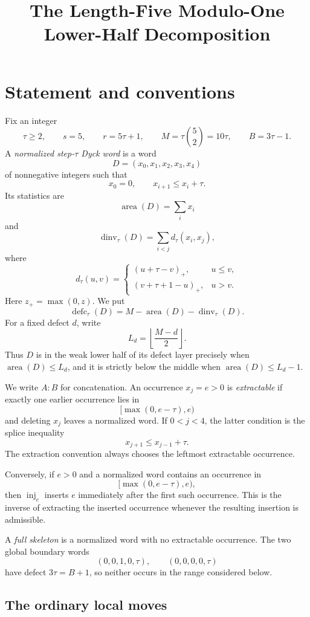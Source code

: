 \documentclass[11pt]{article}
\title{The Length-Five Modulo-One Lower-Half Decomposition}
\author{}
\date{}
\theoremstyle{definition}
\theoremstyle{remark}
\newcommand{\area}{\operatorname{area}}
\newcommand{\dinv}{\operatorname{dinv}}
\newcommand{\defc}{\operatorname{defc}}
\newcommand{\inj}{\operatorname{inj}}
\begin{document}
\maketitle


\section{Statement and conventions}

Fix an integer
\[
  \tau\ge2,
  \qquad s=5,
  \qquad r=5\tau+1,
  \qquad M=\tau\binom52=10\tau,
  \qquad B=3\tau-1.
\]
A \emph{normalized step-$\tau$ Dyck word} is a word
\[
  D=(x_0,x_1,x_2,x_3,x_4)
\]
of nonnegative integers such that
\[
  x_0=0,
  \qquad x_{i+1}\le x_i+\tau.
\]
Its statistics are
\[
  \area(D)=\sum_i x_i
\]
and
\[
  \dinv_\tau(D)=\sum_{i<j}d_\tau(x_i,x_j),
\]
where
\[
 d_\tau(u,v)=
 \begin{cases}
   (u+\tau-v)_+,&u\le v,\\
   (v+\tau+1-u)_+,&u>v.
 \end{cases}
\]
Here $z_+=\max(0,z)$.  We put
\[
  \defc_\tau(D)=M-\area(D)-\dinv_\tau(D).
\]
For a fixed defect $d$, write
\[
  L_d=\left\lfloor\frac{M-d}{2}\right\rfloor.
\]
Thus $D$ is in the weak lower half of its defect layer precisely when
$\area(D)\le L_d$, and it is strictly below the middle when
$\area(D)\le L_d-1$.

We write $A:B$ for concatenation.  An occurrence $x_j=e>0$ is
\emph{extractable} if exactly one earlier occurrence lies in
\[
  [\max(0,e-\tau),e)
\]
and deleting $x_j$ leaves a normalized word.  If $0<j<4$, the latter
condition is the splice inequality
\[
  x_{j+1}\le x_{j-1}+\tau.
\]
The extraction convention always chooses the leftmost extractable
occurrence.

Conversely, if $e>0$ and a normalized word contains an occurrence in
\[
  [\max(0,e-\tau),e),
\]
then $\inj_e$ inserts $e$ immediately after the first such occurrence.
This is the inverse of extracting the inserted occurrence whenever the
resulting insertion is admissible.

A \emph{full skeleton} is a normalized word with no extractable occurrence.
The two global boundary words
\[
  (0,0,1,0,\tau),
  \qquad
  (0,0,0,0,\tau)
\]
have defect $3\tau=B+1$, so neither occurs in the range considered below.

\subsection{The ordinary local moves}
\end{document}
